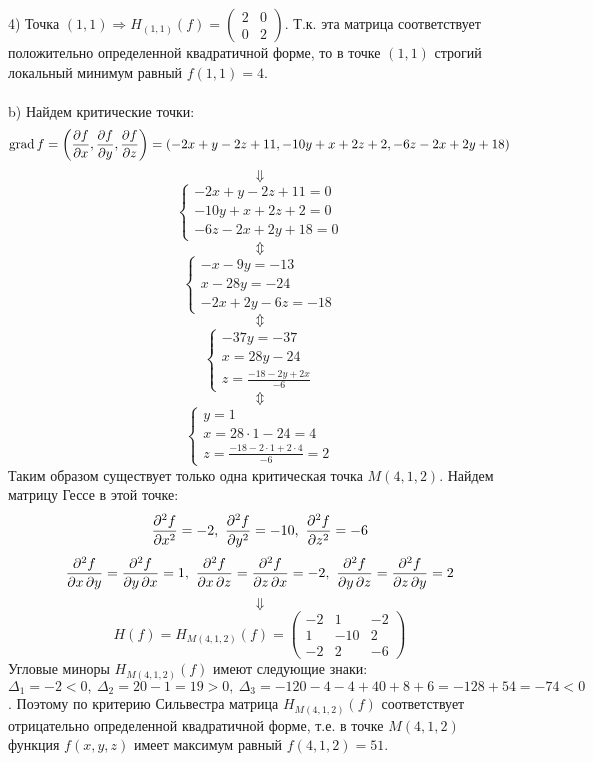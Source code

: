 \documentclass{article}
\DeclareMathOperator{\grad}{grad}
\begin{document}
\par
4) Точка $(1,1)\Rightarrow H_{(1,1)}(f)=\left(\begin{array}{rr}2 & 0\\0 & 2\end{array}\right)$. Т.к. эта матрица соответствует положительно определенной квадратичной форме, то в точке $(1,1)$ строгий локальный минимум равный $f(1,1)=4$.
\\
\\
b) Найдем критические точки:
$$\grad f =\left(\pdv{f}{x}, \pdv{f}{y}, \pdv{f}{z}\right)=\left(-2x+y-2z+11,-10y+x+2z+2,-6z-2x+2y+18\right)$$
$$\Downarrow$$
\begin{equation*}
 \begin{cases}
   -2x+y-2z+11=0\\
   -10y+x+2z+2=0\\
   -6z-2x+2y+18=0
 \end{cases}
\end{equation*}
$$\Updownarrow$$
\begin{equation*}
 \begin{cases}
   -x-9y=-13\\
   x-28y=-24\\
   -2x+2y-6z=-18
 \end{cases}
\end{equation*}
$$\Updownarrow$$
\begin{equation*}
 \begin{cases}
   -37y=-37\\
   x=28y-24\\
   z=\frac{-18-2y+2x}{-6}
 \end{cases}
\end{equation*}
$$\Updownarrow$$
\begin{equation*}
 \begin{cases}
   y=1\\
   x=28\cdot1-24=4\\
   z=\frac{-18-2\cdot1+2\cdot4}{-6}=2
 \end{cases}
\end{equation*}
Таким образом существует только одна критическая точка $M(4,1,2)$. Найдем матрицу Гессе в этой точке:
$$\pdv[order=2]{f}{x}=-2,\ \pdv[order=2]{f}{y}=-10,\ \pdv[order=2]{f}{z}=-6$$
$$\pdv{f}{x,y}=\pdv{f}{y,x}=1,\ \pdv{f}{x,z}=\pdv{f}{z,x}=-2,\ \pdv{f}{y,z}=\pdv{f}{z,y}=2$$
$$\Downarrow$$
$$H(f)=H_{M(4,1,2)}(f)=\left(\begin{array}{rrr}-2 & 1 & -2\\1 & -10 &2\\-2 & 2 & -6\end{array}\right)$$
Угловые миноры $H_{M(4,1,2)}(f)$ имеют следующие знаки: $\Delta_1=-2 < 0,\ \Delta_2=20-1=19 > 0,\ \Delta_3=-120-4-4+40+8+6=-128+54=-74 < 0$. Поэтому по критерию Сильвестра матрица $H_{M(4,1,2)}(f)$ соответствует отрицательно определенной квадратичной форме, т.е. в точке $M(4,1,2)$ функция $f(x,y,z)$ имеет максимум равный $f(4,1,2)=51$.
\end{document}
